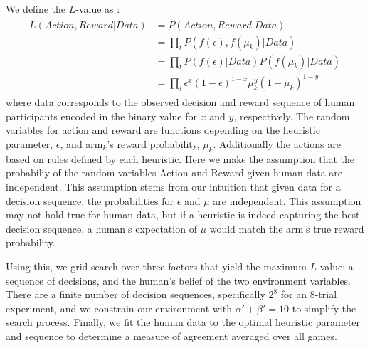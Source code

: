We define the $L$-value as :
\begin{align}
\begin{split}
	\label{eq:likelihood} 
	L(Action,Reward|Data) &= P(Action,Reward|Data) \\
						  &= \prod_{t} P(f(\epsilon),f(\mu_k)|Data) \\
						  &= \prod_{t} P(f(\epsilon)|Data) P(f(\mu_k)|Data) \\	
						  &= \prod_{t} \epsilon^x (1-\epsilon)^{1-x} \mu_k^y (1-\mu_k)^{1-y}
\end{split}
\end{align}
where data corresponds to the observed decision and reward sequence of human participants encoded in the binary value for $x$ and $y$, respectively. The random variables for action and reward are functions depending on the heuristic parameter, $\epsilon$, and arm$_k$'s reward probability, $\mu_k$. Additionally the actions are based on rules defined by each heuristic. Here we make the assumption that the probabiliy of the random variables Action and Reward given human data are independent. This assumption stems from our intuition that given data for a decision sequence, the probabilities for $\epsilon$ and $\mu$ are independent. This assumption may not hold true for human data, but if a heuristic is indeed capturing the best decision sequence, a human's expectation of $\mu$ would match the arm's true reward probability.

Using this, we grid search over three factors that yield the maximum $L$-value: a sequence of decisions, and the human's belief of the two environment variables. There are a finite number of decision sequences, specifically $2^8$ for an 8-trial experiment, and we constrain our environment with $\alpha'+\beta'=10$ to simplify the search process. Finally, we fit the human data to the optimal heuristic parameter and sequence to determine a measure of agreement averaged over all games.

